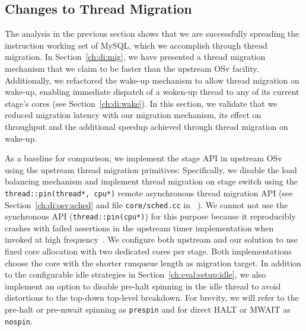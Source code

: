 \documentclass[12pt,a4paper]{book}
\begin{document}
\clearpage
\subsection{Changes to Thread Migration}\label{ch:eval:mig}

The analysis in the previous section shows that we are successfully spreading the instruction working set of MySQL, which we accomplish through thread migration.
In Section~\ref{ch:di:mig}, we have presented a thread migration mechanism that we claim to be faster than the upstream OSv facility.
Additionally, we refactored the wake-up mechanism to allow thread migration on wake-up, enabling immediate dispatch of a woken-up thread to any of its current stage's cores (see Section~\ref{ch:di:wake}).
In this section, we validate that we reduced migration latency with our migration mechanism, its effect on throughput and the additional speedup achieved through thread migration on wake-up.

As a baseline for comparison, we implement the stage API in upstream OSv using the upstream thread migration primitives:
Specifically, we disable the load balancing mechanism and implement thread migration on stage switch using the \lstinline[style=figurecpp]{thread::pin(thread*, cpu*)} remote asynchronous thread migration API (see Section~\ref{ch:di:osv:sched} and file \texttt{core/sched.cc} in ~\cite{osvGit}).
We cannot not use the synchronous API (\lstinline[style=figurecpp]{thread::pin(cpu*)}) for this purpose because it reproducibly crashes with failed assertions in the upstream timer implementation when invoked at high frequency~\cite{osvBugSyncThreadMig}.
We configure both upstream and our solution to use fixed core allocation with two dedicated cores per stage.
Both implementations choose the core with the shorter runqueue length as migration target.
In addition to the configurable idle strategies in Section~\ref{ch:eval:setup:idle}, we also implement an option to disable pre-halt spinning in the idle thread to avoid distortions to the top-down top-level breakdown.
For brevity, we will refer to the pre-halt or pre-mwait spinning as \texttt{prespin} and for direct HALT or MWAIT as \texttt{nospin}.
\end{document}
